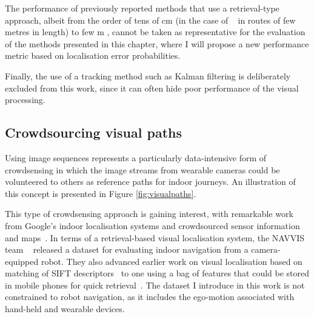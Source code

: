 The performance of previously reported methods that use a retrieval-type approach, albeit from the order of tens of cm (in the case of ~\cite{Matsumoto1996, Ohno1996} in routes of few metres in length) to few m \cite{schroth2011mobile,milford2012seqslam}, cannot be taken as representative for the evaluation of the methods presented in this chapter, where I will propose a new performance metric based on localisation error probabilities. 

Finally, the use of a tracking method such as Kalman filtering is deliberately excluded from this work, since it can often hide poor performance of the visual processing. 

\subsection{Crowdsourcing visual paths}
\label{subsec:visual_paths}

Using image sequences represents a particularly data-intensive form of crowdsensing in which the image streams  from wearable cameras could be volunteered to others as reference paths for indoor journeys. An illustration of this concept is presented in Figure \ref{fig:visualpaths}. 

This type of crowdsensing approach is gaining interest, with remarkable work from Google's indoor localisation systems and crowdsourced sensor information and maps~\cite{Kadous2013}. In terms of a retrieval-based visual localisation system, the NAVVIS team ~\cite{Huitl2012} released a dataset for evaluating indoor navigation from a camera-equipped robot. They also advanced earlier work on visual localisation based on matching of SIFT descriptors~\cite{Park2008} to one using a bag of features that could be stored in mobile phones for quick retrieval~\cite{Schroth2011,Schroth2012}. The dataset I introduce in this work is not constrained to robot navigation, as it includes the ego-motion associated with hand-held and wearable devices.


